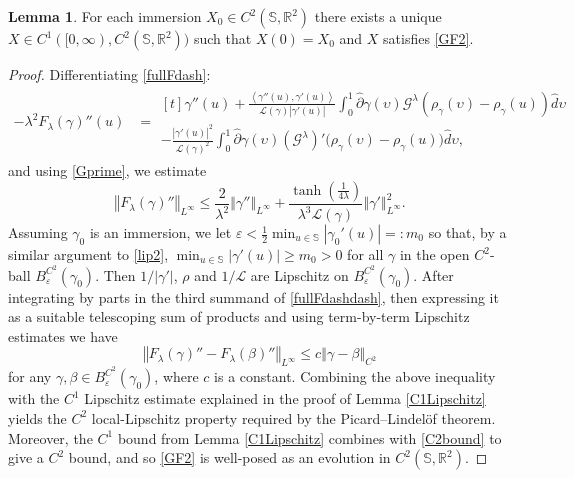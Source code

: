 \documentclass[a4paper,11pt]{amsart}
\theoremstyle{definition}\newtheorem*{definition}{Definition}
\theoremstyle{definition} \newtheorem{proposition}[theorem]{Proposition}
\theoremstyle{definition}\newtheorem{lemma}[theorem]{Lemma}
\theoremstyle{definition}\newtheorem{corollary}[theorem]{Corollary}
\theoremstyle{definition}\newtheorem{example}{Example}
\theoremstyle{remark}\newtheorem*{remark}{Remark}
\def\phat{\hat{\partial} }
\def\R{\mathbb{R}}
\def\S{\mathbb{S}}
\def\G{\mathcal G^\lambda}
\newcommand{\norm}[1]{{\left \Vert {#1}\right \Vert}}
\newcommand{\ip}[1]{{\left \langle {#1} \right \rangle}}
\newcommand{\abs}[1]{\left | {#1}\right |}
\def\length{\mathcal L}
\begin{document}
\begin{lemma}
For each immersion $X_0\in C^{2}(\S,\R^2)$ there exists a unique $X\in C^1([0,\infty),C^{2}(\S,\R^2))$ such that $X(0)=X_0$ and $X$ satisfies \eqref{GF2}. 
\end{lemma}
\begin{proof}
Differentiating \eqref{fullFdash}:
\begin{align}
-\lambda^2 F_\lambda(\gamma)''(u)
\label{fullFdashdash}
&=  \begin{multlined}[t]\gamma''(u)+\frac{\ip{\gamma''(u),\gamma'(u)}}{\length(\gamma)\abs{\gamma'(u)}} \int_0^1  \phat \gamma(\upsilon) \mathcal{G}^\lambda (\rho_\gamma(\upsilon)-\rho_\gamma(u)) \hat d \upsilon \\
-\frac{\abs{\gamma'(u)}^2}{\length(\gamma)^2} \int_0^1  \phat \gamma(\upsilon)  (\G)'\big (\rho_\gamma(\upsilon)-\rho_\gamma(u)\big) \hat d \upsilon ,
\end{multlined}
\end{align}
and using \eqref{Gprime}, we estimate
\begin{equation}\label{C2bound}
\norm{F_\lambda(\gamma)''}_{L^\infty} \leq \frac{2}{\lambda^2}\norm{\gamma''}_{L^\infty}+\frac{\tanh(\tfrac{1}{4\lambda})}{\lambda^3 \length(\gamma)}\norm{\gamma'}^2_{L^\infty}.
\end{equation}
Assuming $\gamma_0$ is an immersion, we let $\varepsilon <\frac{1}{2}\min_{u\in\S}|\gamma_0'(u)|=:m_0$ so that, by a similar argument to \eqref{lip2}, $\min_{u\in\S}|\gamma'(u)|\geq m_0>0$ for all $\gamma$ in the open $C^2$-ball $B_\varepsilon^{C^2}(\gamma_0)$. Then $1/|\gamma'|$, $\rho$ and $1/\length$ are Lipschitz on $B_\varepsilon^{C^2}(\gamma_0)$. After integrating by parts in the third summand of \eqref{fullFdashdash}, then expressing it as a suitable telescoping sum of products and using term-by-term Lipschitz estimates we have
\[
\norm{F_\lambda (\gamma)''-F_\lambda(\beta)''}_{L^\infty} \leq c \norm{\gamma-\beta}_{C^2}
\]
for any $\gamma,\beta \in B_\varepsilon^{C^2}(\gamma_0)$, where $c$ is a constant. Combining the above inequality with the $C^1$ Lipschitz estimate explained in the proof of Lemma \ref{C1Lipschitz} yields the $C^2$ local-Lipschitz property required by the Picard--Lindel\"of theorem. Moreover, the $C^1$ bound from Lemma \ref{C1Lipschitz} combines with \eqref{C2bound} to give a $C^2$ bound, and so \eqref{GF2} is well-posed as an evolution in $C^2(\S,\R^2)$. 


\end{proof}
\end{document}
